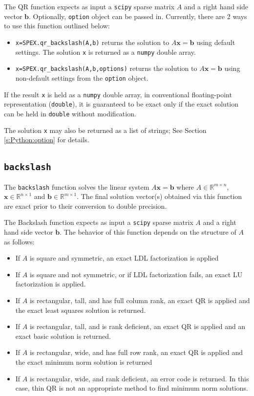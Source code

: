 \documentclass[12pt,oneside]{book}
\theoremstyle{definition}
\renewcommand{\b}{\mathbf{b}}
\newcommand{\x}{\mathbf{x}}
\begin{document}
The QR function expects as input a \verb|scipy| sparse matrix $A$ and a right hand side vector $\b$. Optionally, \verb|option| object can be passed in.
Currently, there are 2 ways to use this function outlined below:

\begin{itemize}
    \item \verb|x=SPEX.qr_backslash(A,b)| returns the solution to $A \x = \b$ using default settings. The solution \verb|x| is returned as a \verb|numpy| double array.
    \item \verb|x=SPEX.qr_backslash(A,b,options)| returns the solution to $A \x = \b$ using non-default settings from the \verb|option| object.
\end{itemize}

If the result \verb|x| is held as a \verb|numpy| double array, in conventional floating-point representation (\verb|double|), it is guaranteed to be exact only if the exact solution can be held in \verb|double| without modification.

The solution \verb|x| may also be returned as a list of strings; See Section \ref{s:Python:option} for details.


\subsection{\texttt{backslash}}
The \verb|backslash| function solves the linear system $A\x=\b$ where $A \in \mathbb{R}^{m \times n}$, $\x \in \mathbb{R}^{n \times 1}$ and $\b \in \mathbb{R}^{m \times 1}$. The final solution vector(s) obtained via this function are exact prior to their conversion to double precision.

The Backslash function expects as input a \verb|scipy| sparse matrix $A$ and a right hand side vector $\b$. The behavior of this function depends on the structure of $A$ as follows:
\begin{itemize}
    \item If $A$ is square and symmetric, an exact LDL factorization is applied
    \item If $A$ is square and not symmetric, or if LDL factorization fails, an exact LU factorization is applied.
    \item If $A$ is rectangular, tall, and has full column rank, an exact QR is applied and the exact least squares solution is returned.
    \item If $A$ is rectangular, tall, and is rank deficient, an exact QR is applied and an exact basic solution is returned.
    \item If $A$ is rectangular, wide, and has full row rank, an exact QR is applied and the exact minimum norm solution is returned
    \item If $A$ is rectangular, wide, and rank deficient, an error code is returned. In this case, thin QR is not an appropriate method to find minimum norm solutions.
\end{itemize}
\end{document}
